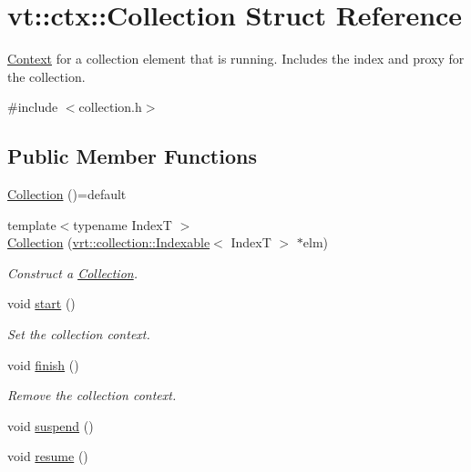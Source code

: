 \hypertarget{structvt_1_1ctx_1_1_collection}{}\section{vt\+:\+:ctx\+:\+:Collection Struct Reference}
\label{structvt_1_1ctx_1_1_collection}


\hyperlink{structvt_1_1ctx_1_1_context}{Context} for a collection element that is running. Includes the index and proxy for the collection.  




{\ttfamily \#include $<$collection.\+h$>$}

\subsection*{Public Member Functions}
\begin{DoxyCompactItemize}
\item 
\hyperlink{structvt_1_1ctx_1_1_collection_a19c7871680086e92be70f24d58bb0321}{Collection} ()=default
\item 
{\footnotesize template$<$typename IndexT $>$ }\\\hyperlink{structvt_1_1ctx_1_1_collection_a461f8690260111c0dd2f21bd1b3acf6c}{Collection} (\hyperlink{structvt_1_1vrt_1_1collection_1_1_indexable}{vrt\+::collection\+::\+Indexable}$<$ IndexT $>$ $\ast$elm)
\begin{DoxyCompactList}\small\item\em Construct a {\ttfamily \hyperlink{structvt_1_1ctx_1_1_collection}{Collection}}. \end{DoxyCompactList}\item 
void \hyperlink{structvt_1_1ctx_1_1_collection_a1e3f697ae3b3fd29c094d024c31aba80}{start} ()
\begin{DoxyCompactList}\small\item\em Set the collection context. \end{DoxyCompactList}\item 
void \hyperlink{structvt_1_1ctx_1_1_collection_a895a1ad1d3344e14a95a7553383281d8}{finish} ()
\begin{DoxyCompactList}\small\item\em Remove the collection context. \end{DoxyCompactList}\item 
void \hyperlink{structvt_1_1ctx_1_1_collection_a39de5ab4cdfb27951f981cd3c43a7ee0}{suspend} ()
\item 
void \hyperlink{structvt_1_1ctx_1_1_collection_a86fc6bda09b1cc705c99f7ccfba01fa2}{resume} ()
\end{DoxyCompactItemize}
